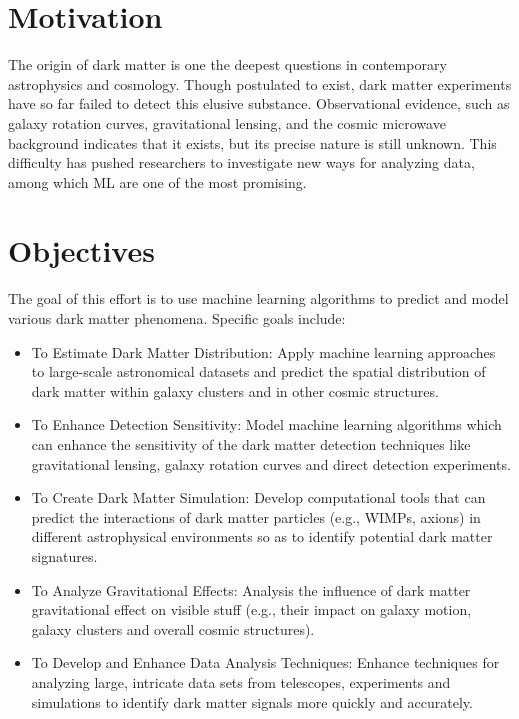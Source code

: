 \section{Motivation}
The origin of dark matter is one the deepest questions in contemporary astrophysics and cosmology. Though postulated to exist, dark matter experiments have so far failed to detect this elusive substance. Observational evidence, such as galaxy rotation curves, gravitational lensing, and the cosmic microwave background indicates that it exists, but its precise nature is still unknown. This difficulty has pushed researchers to investigate new ways for analyzing data, among which ML are one of the most promising.

 



 
\section{Objectives} 
The goal of this effort is to use machine learning algorithms to predict and model various dark matter phenomena. Specific goals include:

\begin{itemize}
    \item To Estimate Dark Matter Distribution: Apply machine learning approaches to large-scale astronomical datasets and predict the spatial distribution of dark matter within galaxy clusters and in other cosmic structures.

    \item To Enhance Detection Sensitivity: Model machine learning algorithms which can enhance the sensitivity of the dark matter detection techniques like gravitational lensing, galaxy rotation curves and direct detection experiments.

    \item To Create Dark Matter Simulation: Develop computational tools that can predict the interactions of dark matter particles (e.g., WIMPs, axions) in different astrophysical environments so as to identify potential dark matter signatures.

    \item To Analyze Gravitational Effects: Analysis the influence of dark matter gravitational effect on visible stuff (e.g., their impact on galaxy motion, galaxy clusters and overall cosmic structures).

    \item To Develop and Enhance Data Analysis Techniques: Enhance techniques for analyzing large, intricate data sets from telescopes, experiments and simulations to identify dark matter signals more quickly and accurately.
\end{itemize}

